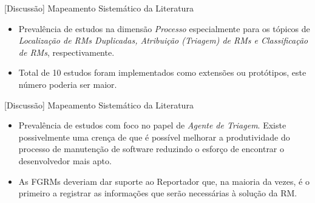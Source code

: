 \documentclass[t,14pt,mathserif]{beamer}
\begin{document}
\begin{frame}{[Discussão] Mapeamento Sistemático da Literatura}

    \begin{itemize}

        \item Prevalência de estudos na dimensão \textit{Processo} especialmente
              para os tópicos de \textit{Localização de RMs Duplicadas,
              Atribuição (Triagem) de RMs e Classificação de RMs},
              respectivamente.

        \item Total de 10 estudos foram implementados como extensões ou
              protótipos, este número poderia ser maior.

    \end{itemize}

\end{frame}

\begin{frame}{[Discussão] Mapeamento Sistemático da Literatura}

    \begin{itemize}
        \item Prevalência de estudos com foco no papel de
            \textit{Agente de Triagem}. Existe possivelmente uma crença de que é
            possível melhorar a produtividade do processo de manutenção de
            software reduzindo o esforço de encontrar o desenvolvedor mais apto.

        \item As FGRMs deveriam dar suporte ao Reportador que, na maioria da
            vezes, é o primeiro a registrar as informações que serão necessárias
            à solução da RM\@.

    \end{itemize}

\end{frame}
\end{document}
